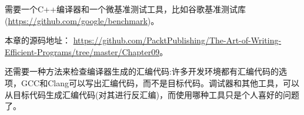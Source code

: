 需要一个C++编译器和一个微基准测试工具，比如谷歌基准测试库(\url{https://github.com/google/benchmark})。 

本章的源码地址： \url{https://github.com/PacktPublishing/The-Art-of-Writing-Efficient-Programs/tree/master/Chapter09}。

还需要一种方法来检查编译器生成的汇编代码:许多开发环境都有汇编代码的选项，GCC和Clang可以写出汇编代码，而不是目标代码。调试器和其他工具，可以从目标代码生成汇编代码(对其进行反汇编)，而使用哪种工具只是个人喜好的问题了。